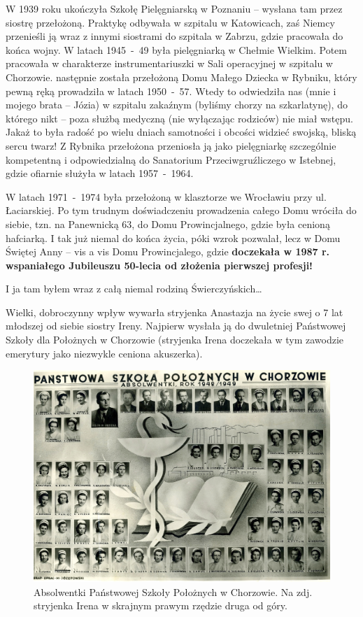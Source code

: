 W 1939 roku ukończyła Szkołę Pielęgniarską w Poznaniu -- wysłana tam przez siostrę przełożoną. Praktykę odbywała w szpitalu w Katowicach, zaś Niemcy przenieśli ją wraz z innymi siostrami do szpitala w Zabrzu, gdzie pracowała do końca wojny. W latach 1945~-~49 była pielęgniarką w Chełmie Wielkim. Potem pracowała w charakterze instrumentariuszki w Sali operacyjnej w szpitalu w Chorzowie. następnie została przełożoną Domu Małego Dziecka w Rybniku, który pewną ręką prowadziła w latach 1950~-~57. Wtedy to odwiedziła nas (mnie i mojego brata -- Józia) w szpitalu zakaźnym (byliśmy chorzy na szkarlatynę), do którego nikt – poza służbą medyczną (nie wyłączając rodziców) nie miał wstępu. Jakaż to była radość po wielu dniach samotności i obcości widzieć swojską, bliską sercu twarz! Z Rybnika przełożona przeniosła ją jako pielęgniarkę szczególnie kompetentną i odpowiedzialną do Sanatorium Przeciwgruźliczego w Istebnej, gdzie ofiarnie służyła w latach 1957~-~1964.

W latach 1971~-~1974 była przełożoną w klasztorze we Wrocławiu przy ul. Łaciarskiej. Po tym trudnym doświadczeniu prowadzenia całego Domu wróciła do siebie, tzn. na Panewnicką 63, do Domu Prowincjalnego, gdzie była cenioną hafciarką. I tak już niemal do końca życia, póki wzrok pozwalał, lecz w Domu Świętej Anny -- vis a vis Domu Prowincjalego, gdzie \textbf{doczekała w 1987 r. wspaniałego Jubileuszu 50-lecia od złożenia pierwszej profesji!} 

I ja tam byłem wraz z całą niemal rodziną Świerczyńskich\ldots

Wielki, dobroczynny wpływ wywarła stryjenka Anastazja na życie swej o 7 lat młodszej od siebie siostry Ireny. Najpierw wysłała ją do dwuletniej Państwowej Szkoły dla Położnych w Chorzowie (stryjenka Irena doczekała w tym zawodzie emerytury jako niezwykle ceniona akuszerka).
\begin{figure}[!h]
\begin{center}
\includegraphics[width=\textwidth]{photo/szkola_poloznych_w_chorzowie.jpg}
\caption[Absolwentki Państwowej Szkoły Położnych w Chorzowie.]{Absolwentki Państwowej Szkoły Położnych w Chorzowie. Na zdj. stryjenka Irena w skrajnym prawym rzędzie druga od góry.}
\label{rys:szkola_poloznych_w_chorzowie}
\end{center}
\end{figure}

